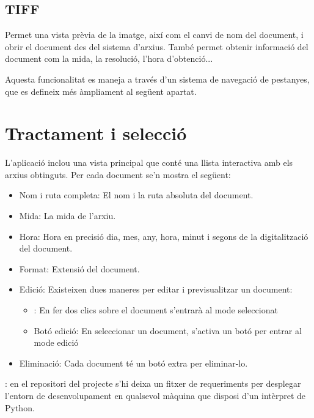 \documentclass[letterpaper,11pt,catalan]{sphinxmanual}
\begin{document}
\subsection{TIFF}
\label{\detokenize{index:tiff}}
Permet una vista prèvia de la imatge, així com el canvi de nom del document, i obrir
el document des del sistema d'arxius. També permet obtenir informació del document
com la mida, la resolució, l'hora d'obtenció...

Aquesta funcionalitat es maneja a través d'un sistema de navegació de pestanyes,
que es defineix més àmpliament al següent apartat.


\section{Tractament i selecció}
\label{\detokenize{index:tractament-i-seleccio}}
L'aplicació inclou una vista principal que conté una llista interactiva amb els arxius
obtinguts. Per cada document se'n mostra el següent:
\begin{itemize}
\item {} 
Nom i ruta completa: El nom i la ruta absoluta del document.

\item {} 
Mida: La mida de l'arxiu.

\item {} 
Hora: Hora en precisió dia, mes, any, hora, minut i segons de la digitalització del document.

\item {} 
Format: Extensió del document.

\item {} 
Edició: Existeixen dues maneres per editar i previsualitzar un document:
\begin{itemize}
\item {} 
: En fer dos clics sobre el document s'entrarà al mode seleccionat

\item {} 
Botó edició: En seleccionar un document, s'activa un botó per entrar al mode edició

\end{itemize}

\item {} 
Eliminació: Cada document té un botó extra per eliminar-lo.

\end{itemize}

: en el repositori del projecte s'hi deixa un fitxer de requeriments per desplegar
l'entorn de desenvolupament en qualsevol màquina que disposi d'un intèrpret de Python.
\end{document}
